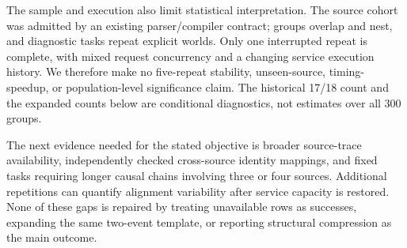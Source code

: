 The sample and execution also limit statistical interpretation. The source cohort was admitted by an existing parser/compiler contract; groups overlap and nest, and diagnostic tasks repeat explicit worlds. Only one interrupted repeat is complete, with mixed request concurrency and a changing service execution history. We therefore make no five-repeat stability, unseen-source, timing-speedup, or population-level significance claim. The historical 17/18 count and the expanded counts below are conditional diagnostics, not estimates over all 300 groups.

The next evidence needed for the stated objective is broader source-trace availability, independently checked cross-source identity mappings, and fixed tasks requiring longer causal chains involving three or four sources. Additional repetitions can quantify alignment variability after service capacity is restored. None of these gaps is repaired by treating unavailable rows as successes, expanding the same two-event template, or reporting structural compression as the main outcome.
